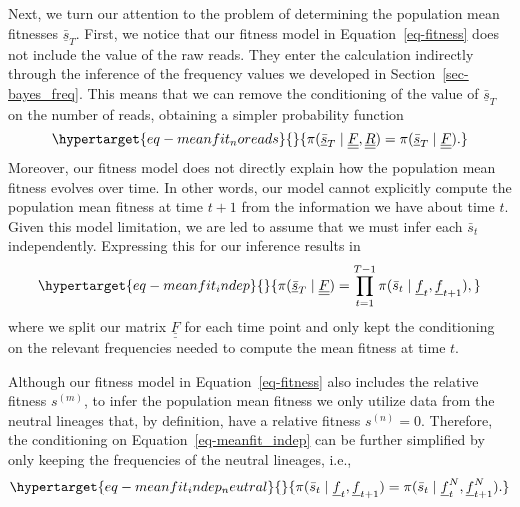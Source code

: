 \documentclass[
]{scrartcl}
\begin{document}
\begin{refsegment}
Next, we turn our attention to the problem of determining the population
mean fitnesses \(\underline{\bar{s}}_T\). First, we notice that our
fitness model in Equation~\ref{eq-fitness} does not include the value of
the raw reads. They enter the calculation indirectly through the
inference of the frequency values we developed in
Section~\ref{sec-bayes_freq}. This means that we can remove the
conditioning of the value of \(\underline{\bar{s}}_T\) on the number of
reads, obtaining a simpler probability function
\begin{equation}\protect\hypertarget{eq-meanfit_noreads}{}{
\pi(
    \underline{\bar{s}}_T \mid 
    \underline{\underline{F}}, \underline{\underline{R}}
) = 
\pi(
    \underline{\bar{s}}_T \mid 
    \underline{\underline{F}}
).
}\label{eq-meanfit_noreads}\end{equation} Moreover, our fitness model
does not directly explain how the population mean fitness evolves over
time. In other words, our model cannot explicitly compute the population
mean fitness at time \(t+1\) from the information we have about time
\(t\). Given this model limitation, we are led to assume that we must
infer each \(\bar{s}_t\) independently. Expressing this for our
inference results in
\begin{equation}\protect\hypertarget{eq-meanfit_indep}{}{
\pi(
    \underline{\bar{s}}_T \mid 
    \underline{\underline{F}}
) =
\prod_{t=1}^{T-1} \pi(\bar{s}_t \mid \underline{f}_t, \underline{f}_{t+1}),
}\label{eq-meanfit_indep}\end{equation} where we split our matrix
\(\underline{\underline{F}}\) for each time point and only kept the
conditioning on the relevant frequencies needed to compute the mean
fitness at time \(t\).

Although our fitness model in Equation~\ref{eq-fitness} also includes
the relative fitness \(s^{(m)}\), to infer the population mean fitness
we only utilize data from the neutral lineages that, by definition, have
a relative fitness \(s^{(n)} = 0\). Therefore, the conditioning on
Equation~\ref{eq-meanfit_indep} can be further simplified by only
keeping the frequencies of the neutral lineages, i.e.,
\begin{equation}\protect\hypertarget{eq-meanfit_indep_neutral}{}{
\pi(\bar{s}_t \mid \underline{f}_t, \underline{f}_{t+1}) =
\pi(\bar{s}_t \mid \underline{f}_t^N, \underline{f}_{t+1}^N).
}\label{eq-meanfit_indep_neutral}\end{equation}


\end{refsegment}
\end{document}
